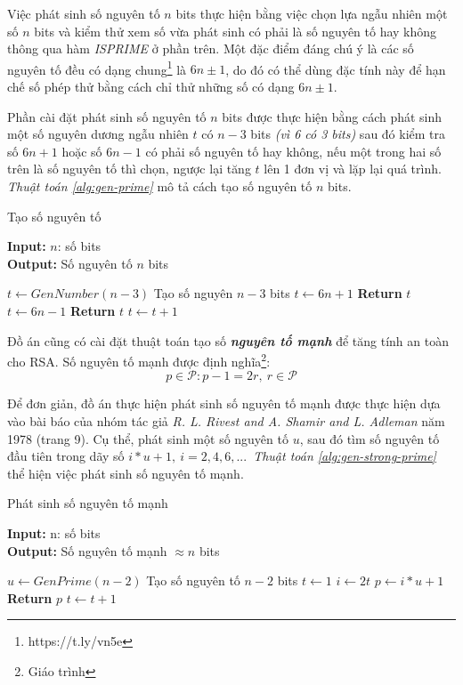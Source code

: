 Việc phát sinh số nguyên tố $n$ bits thực hiện bằng việc chọn lựa ngẫu nhiên một số $n$ bits và kiểm thử xem số vừa phát sinh có phải là số nguyên tố hay không 
thông qua hàm \textit{ISPRIME} ở phần trên. Một đặc điểm đáng chú ý là các số nguyên tố đều có dạng chung\footnote{https://t.ly/vn5e} là  $6n \pm 1$, do đó có thể dùng đặc tính này để hạn chế số phép 
thử bằng cách chỉ thử những số có dạng $6n \pm 1$.

Phần cài đặt phát sinh số nguyên tố $n$ bits được thực hiện bằng cách phát sinh một số nguyên dương ngẫu nhiên $t$ có $n-3$ bits \textit{(vì 6 có 3 bits)} sau đó kiểm tra số 
$6n + 1$ hoặc số $6n - 1$ có phải số nguyên tố hay không, nếu một trong hai số trên là số nguyên tố thì chọn, ngược lại tăng $t$ lên 1 đơn vị và lặp lại quá trình. 
\textit{Thuật toán \ref{alg:gen-prime}} mô tả cách tạo số nguyên tố $n$ bits.

\begin{algorithm} [H]
\caption{Tạo số nguyên tố}\label{alg:gen-prime}
\hspace*{\algorithmicindent} \textbf{Input:} $n$: số bits\\
\hspace*{\algorithmicindent} \textbf{Output:} Số nguyên tố $n$ bits 
\begin{algorithmic}[1]
\State $t \gets GenNumber(n-3)$ \Comment Tạo số nguyên $n-3$ bits
\State $t \gets 6n + 1$
\State \textbf{Return } $t$
\EndIf
\State $t \gets 6n - 1$
\State \textbf{Return } $t$
\EndIf
\State $t \gets t + 1$
\EndWhile
\EndProcedure
\end{algorithmic}
\end{algorithm}

Đồ án cũng có cài đặt thuật toán tạo số \textbf{\textit{nguyên tố mạnh}} để tăng tính an toàn cho RSA. Số nguyên tố mạnh được định nghĩa\footnote{Giáo trình}:
\[ p \in \mathcal{P}: p - 1 = 2r,\ r \in \mathcal{P} \]

Để đơn giản, đồ án thực hiện phát sinh số nguyên tố mạnh được thực hiện dựa vào bài báo \cite{Rivest1978} của nhóm tác giả \textit{R. L. Rivest and 
A. Shamir and L. Adleman} năm 1978 (trang 9). Cụ thể, phát sinh một số nguyên tố $u$, sau đó tìm số nguyên tố đầu tiên trong dãy số $i*u + 1,\ i=2,4,6,...$\ \textit{Thuật toán \ref{alg:gen-strong-prime}} 
thể hiện việc phát sinh số nguyên tố mạnh.

\begin{algorithm} [H]
\caption{Phát sinh số nguyên tố mạnh}\label{alg:gen-strong-prime}
\hspace*{\algorithmicindent} \textbf{Input:} n: số bits\\
\hspace*{\algorithmicindent} \textbf{Output:} Số nguyên tố mạnh $\approx n$ bits 
\begin{algorithmic}[1]
\State $u \gets GenPrime(n-2)$ \Comment Tạo số nguyên tố $n-2$ bits
\State $t \gets 1$
\State $i \gets 2t$
\State $p \gets i*u + 1$
\State \textbf{Return } $p$
\EndIf
\State $t \gets t + 1$
\EndWhile
\EndProcedure
\end{algorithmic}
\end{algorithm}

